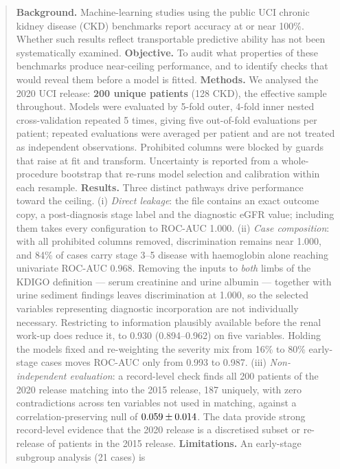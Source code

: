 \documentclass[conference]{IEEEtran}
\begin{document}
\begin{abstract}
\textbf{Background.} Machine-learning studies using the public UCI chronic
kidney disease (CKD) benchmarks report accuracy at or near 100\%.
Whether such results reflect transportable predictive ability has not been
systematically examined.
\textbf{Objective.} To audit what properties of these benchmarks produce
near-ceiling performance, and to identify checks that would reveal them
before a model is fitted.
\textbf{Methods.} We analysed the 2020 UCI release: \textbf{200 unique
patients} (128 CKD), the effective sample throughout. Models were evaluated
by 5-fold outer, 4-fold inner nested cross-validation repeated 5 times,
giving five out-of-fold evaluations per patient; repeated evaluations were
averaged per patient and are not treated as independent observations.
Prohibited columns were blocked by guards that raise at fit and transform.
Uncertainty is reported from a whole-procedure bootstrap that re-runs model
selection and calibration within each resample.
\textbf{Results.} Three distinct pathways drive performance toward the
ceiling. (i) \emph{Direct leakage}: the file contains an exact outcome copy,
a post-diagnosis stage label and the diagnostic eGFR value; including them
takes every configuration to ROC-AUC 1.000. (ii) \emph{Case composition}:
with all prohibited columns removed, discrimination remains near 1.000, and
84\% of cases carry stage 3--5 disease with haemoglobin alone reaching
univariate ROC-AUC 0.968. Removing the inputs to \emph{both} limbs of the
KDIGO definition --- serum creatinine and urine albumin --- together with
urine sediment findings leaves discrimination at 1.000, so the selected
variables representing diagnostic incorporation are not individually
necessary. Restricting to information plausibly available before the renal
work-up does reduce it, to 0.930 (0.894--0.962) on five variables. Holding
the models fixed and re-weighting the severity mix from 16\% to 80\%
early-stage cases moves ROC-AUC only from 0.993 to 0.987. (iii) \emph{Non-independent evaluation}: a record-level
check finds all 200 patients of the 2020 release matching into the 2015
release, 187 uniquely, with zero contradictions across ten variables not used
in matching, against a correlation-preserving null of $\NullCopulaMean \pm \NullCopulaSD$. The
data provide strong record-level evidence that the 2020 release is a
discretised subset or re-release of patients in the 2015 release.
\textbf{Limitations.} An early-stage subgroup analysis (21 cases) is

\end{abstract}
\end{document}
